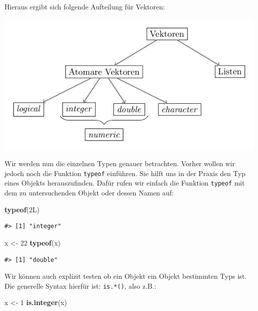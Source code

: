 \documentclass[]{tufte-book}
\newenvironment{Shaded}{}{}
\newcommand{\KeywordTok}[1]{\textcolor[rgb]{0.00,0.44,0.13}{\textbf{#1}}}
\newcommand{\DecValTok}[1]{\textcolor[rgb]{0.25,0.63,0.44}{#1}}
\newcommand{\StringTok}[1]{\textcolor[rgb]{0.25,0.44,0.63}{#1}}
\newcommand{\NormalTok}[1]{#1}
\begin{document}
Hieraus ergibt sich folgende Aufteilung für Vektoren:

\begin{center}\includegraphics[width=0.8\linewidth]{figures/vector-classification} \end{center}

Wir werden nun die einzelnen Typen genauer betrachten. Vorher wollen wir
jedoch noch die Funktion \texttt{typeof} einführen. Sie hilft uns in der
Praxis den Typ eines Objekts herauszufinden. Dafür rufen wir einfach die
Funktion \texttt{typeof} mit dem zu untersuchenden Objekt oder dessen
Namen auf:

\begin{Shaded}
\begin{Highlighting}[]
\KeywordTok{typeof}\NormalTok{(2L)}
\end{Highlighting}
\end{Shaded}

\begin{verbatim}
#> [1] "integer"
\end{verbatim}

\begin{Shaded}
\begin{Highlighting}[]
\NormalTok{x <-}\StringTok{ }\DecValTok{22}
\KeywordTok{typeof}\NormalTok{(x)}
\end{Highlighting}
\end{Shaded}

\begin{verbatim}
#> [1] "double"
\end{verbatim}

Wir können auch explizit testen ob ein Objekt ein Objekt bestimmten Typs
ist. Die generelle Syntax hierfür ist: \texttt{is.*()}, also z.B.:

\begin{Shaded}
\begin{Highlighting}[]
\NormalTok{x <-}\StringTok{ }\DecValTok{1}
\KeywordTok{is.integer}\NormalTok{(x)}
\end{Highlighting}
\end{Shaded}
\end{document}
